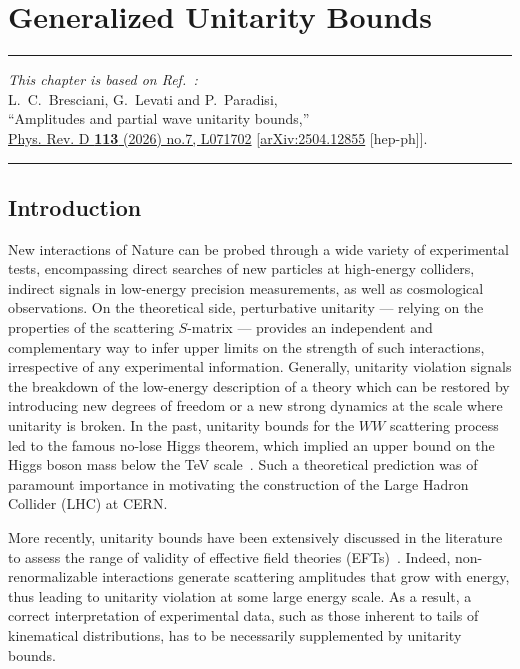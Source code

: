 \chapter{Generalized Unitarity Bounds\label{ch:generalizedUB}}

\begin{flushright}
\small

{\color{chapterpaperrule}\rule{\textwidth}{0.5pt}}

\textit{This chapter is based on Ref.~\cite{Bresciani:2025toe}:}\\[0.5em]
L.~C.~Bresciani, G.~Levati and P.~Paradisi,\\
``Amplitudes and partial wave unitarity bounds,''\\
\href{https://doi.org/10.1103/tp6m-mcyn}{Phys. Rev. D \textbf{113} (2026) no.7, L071702}
[\href{https://doi.org/10.48550/arXiv.2504.12855}{arXiv:2504.12855} [hep-ph]].

{\color{chapterpaperrule}\rule{\textwidth}{0.5pt}}
\end{flushright}

\section{Introduction}

New interactions of Nature can be probed through a wide variety of experimental tests, encompassing direct searches of new particles at high-energy colliders, indirect signals in low-energy precision measurements, as well as cosmological observations. 
On the theoretical side, perturbative unitarity --- relying on the properties of the scattering $S$-matrix --- provides an independent and complementary way to infer upper limits on the strength of such interactions, irrespective of any experimental information.
Generally, unitarity violation signals the breakdown of the low-energy description of a theory which can be restored by introducing new degrees of freedom or a new strong dynamics at the scale where unitarity is broken.
In the past, unitarity bounds for the $WW$ scattering process led to the famous no-lose Higgs theorem, which implied an upper bound on the Higgs boson mass below the TeV scale~\cite{Lee:1977yc,Lee:1977eg}.
Such a theoretical prediction was of paramount importance in motivating the construction of the Large Hadron Collider (LHC) at CERN. 

More recently, unitarity bounds have been extensively discussed in the literature to assess the range of validity of effective field theories (EFTs)~\cite{Gounaris:1994cm,Corbett:2014ora,Corbett:2017qgl,DiLuzio:2017chi,DiLuzio:2016sur,Mahmud:2024iyn,Allwicher:2021jkr,Cohen:2021ucp,Abu-Ajamieh:2020yqi,Cao:2023qks,Eboli:2026ccq,Degrande:2025uil,Almeida:2020ylr,Cohen:2021gdw,Brivio:2021fog,Falkowski:2019tft,Chang:2019vez,Alonso:2025ksv}.
Indeed, non-renormalizable interactions generate scattering amplitudes that grow with energy, thus leading to unitarity violation at some large energy scale. 
As a result, a correct interpretation of experimental data, such as those inherent to tails of kinematical distributions, has to be necessarily supplemented by unitarity bounds.


